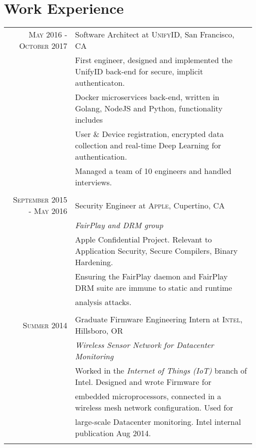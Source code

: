 \documentclass[lettersize,10pt]{article}
\begin{document}
\section{Work Experience}
\begin{tabular}{rl}
\textsc{ May 2016 - October 2017} & Software Architect at \textsc{UnifyID}, San Francisco, CA\\
&\footnotesize{First engineer, designed and implemented the UnifyID back-end for secure, implicit authenticaton. }\\
&\footnotesize{Docker microservices back-end, written in Golang, NodeJS and Python, functionality includes }\\
&\footnotesize{User \& Device registration, encrypted data collection and real-time Deep Learning for authentication. }\\
&\footnotesize{Managed a team of 10 engineers and handled interviews.}\\\multicolumn{2}{c}{} \\

\textsc{September 2015 - May 2016} & Security Engineer at \textsc{Apple}, Cupertino, CA \\&\emph{FairPlay and DRM group}\\
&\footnotesize{Apple Confidential Project. Relevant to Application Security, Secure Compilers, Binary Hardening.} \\
&\footnotesize{Ensuring the FairPlay daemon and FairPlay DRM suite are immune to static and runtime }\\
&\footnotesize{analysis attacks.}\\\multicolumn{2}{c}{} \\

\textsc{Summer 2014} & Graduate Firmware Engineering Intern at \textsc{Intel}, Hillsboro, OR \\&\emph{Wireless Sensor Network for Datacenter Monitoring}\\
&\footnotesize{Worked in the \textit{Internet of Things (IoT)} branch of Intel. Designed and wrote Firmware for} \\
&\footnotesize{embedded microprocessors, connected in a wireless mesh network configuration. Used for} \\
&\footnotesize{large-scale Datacenter monitoring. Intel internal publication Aug 2014.}\\\multicolumn{2}{c}{} \\
\end{tabular}

\end{document}

